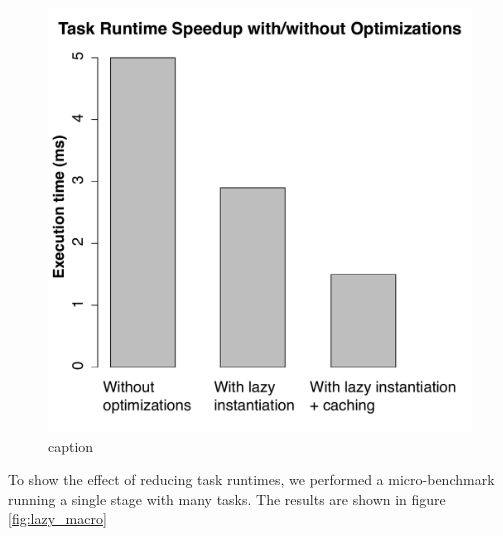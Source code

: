 \begin{figure}[t!]
 \begin{center}
   \includegraphics[scale=0.45]{images_graphs/optimizations/graph3/runtime_optimizations.pdf}
 \end{center}
 \caption{caption}
 \label{fig:runtime_optimizations}
\end{figure}

To show the effect of reducing task runtimes, we performed a micro-benchmark running a single stage with many tasks. The results are shown in figure \ref{fig:lazy_macro}

